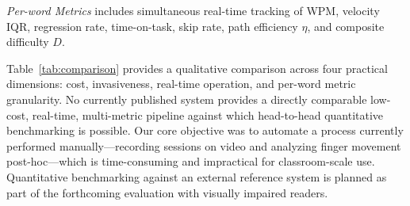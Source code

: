 \documentclass[conference]{IEEEtran}
\begin{document}
    \begin{table}[!htp]
    \vspace{-6mm}
    \caption{Comparison of Braille Reading Analysis Systems}
    \vspace{-8mm}
    \label{tab:comparison}
    \begin{center}
    \end{center}
    {\footnotesize \textit{Per-word Metrics} includes simultaneous real-time tracking of WPM,
    velocity IQR, regression rate, time-on-task, skip rate, path efficiency $\eta$,
    and composite difficulty $D$.}
    \vspace{-6mm}
    \end{table}

    Table~\ref{tab:comparison} provides a qualitative comparison across four practical dimensions: cost, invasiveness, real-time operation, and per-word metric granularity. No currently published system provides a directly comparable low-cost, real-time, multi-metric pipeline against which head-to-head quantitative benchmarking is possible. Our core objective was to automate a process currently performed manually---recording sessions on video and analyzing finger movement post-hoc---which is time-consuming and impractical for classroom-scale use. Quantitative benchmarking against an external reference system is planned as part of the forthcoming evaluation with visually impaired readers.
\end{document}
